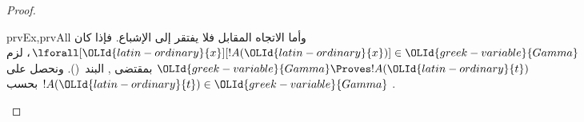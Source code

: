 \documentclass[../../../include/open-logic-section]{subfiles}
\begin{document}
\begin{proof}
\begin{tagenumerate}{prvEx,prvAll}
{{      وأما الاتجاه المقابل فلا يفتقر إلى الإشباع. فإذا كان
      $\lforall[{\OLId{latin-ordinary}{x}}][!A({\OLId{latin-ordinary}{x}})] \in {\OLId{greek-variable}{Gamma}}$، لزم ${\OLId{greek-variable}{Gamma}} \Proves !A({\OLId{latin-ordinary}{t}})$
      بمقتضى
      ,
      البند~(). ونحصل على $!A({\OLId{latin-ordinary}{t}}) \in {\OLId{greek-variable}{Gamma}}$ بحسب
      .}}{}
  \end{tagenumerate}
\end{proof}
\end{document}
